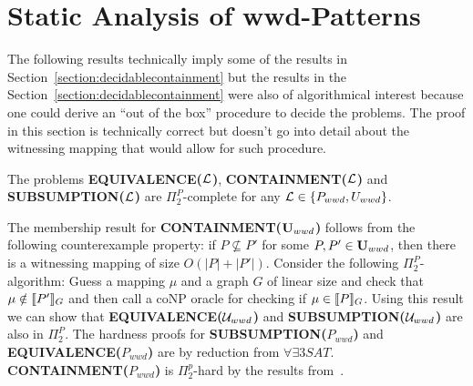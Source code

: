 \section{Static Analysis of wwd-Patterns}

The following results technically imply some of the results in
Section~\ref{section:decidablecontainment} but the results in the Section~\ref{section:decidablecontainment}
were also of algorithmical interest because one could derive an ``out of the box''
procedure to decide the problems. The proof in this section is technically
correct but doesn't go into detail about the witnessing mapping that would allow
for such procedure.

\begin{theorem}
	The problems \textbf{EQUIVALENCE($\mathcal{L}$)}, \textbf{CONTAINMENT($\mathcal{L}$)} and
	\textbf{SUBSUMPTION($\mathcal{L}$)} are $\Pi_2^P$-complete 
	for any $\mathcal{L} \in \{ P_{wwd}, U_{wwd} \}$.
\end{theorem}
\begin{proofidea}
	The membership result for \textbf{CONTAINMENT($\mathbf{U}_{wwd}$)} follows from the following
	counterexample property: 
	if $P \not\subseteq P'$ for some $P,P' \in \mathbf{U}_{wwd}$, then
	there is a witnessing mapping of size $O(|P| + |P'|)$.
	Consider the following $\Pi^P_2$-algorithm:
	Guess a mapping $\mu$ and a graph $G$ of linear size and check that $\mu
	\notin \llbracket P' \rrbracket_G$ and then call a coNP oracle for checking if $\mu
	\in \llbracket P \rrbracket_G$.
	Using this result we can show that \textbf{EQUIVALENCE($\mathcal{U}_{wwd}$)}  
	and \textbf{SUBSUMPTION($\mathcal{U}_{wwd}$)} are also in $\Pi^P_2$.
	The hardness proofs for \textbf{SUBSUMPTION($P_{wwd}$)} and\\
	\textbf{EQUIVALENCE($P_{wwd}$)} are by reduction from
	$\forall\exists3SAT$.\\
	\textbf{CONTAINMENT($P_{wwd}$)} is $\Pi^p_2$-hard by the results from~\cite{pichler2014containment}.
\end{proofidea}

